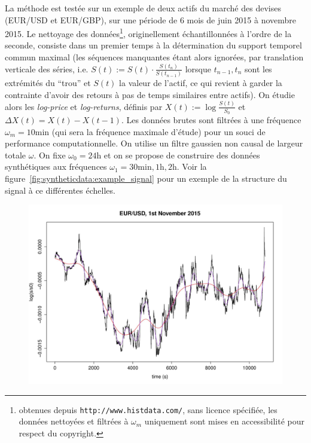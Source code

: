 {La méthode est testée sur un exemple de deux actifs du marché des devises (EUR/USD et EUR/GBP), sur une période de 6 mois de juin 2015 à novembre 2015. Le nettoyage des données\footnote{obtenues depuis \texttt{http://www.histdata.com/}, sans licence spécifiée, les données nettoyées et filtrées à $\omega_m$ uniquement sont mises en accessibilité pour respect du copyright.}, originellement échantillonnées à l'ordre de la seconde, consiste dans un premier temps à la détermination du support temporel commun maximal (les séquences manquantes étant alors ignorées, par translation verticale des séries, i.e. $S(t):=S(t)\cdot \frac{S(t_{n})}{S(t_{n-1})}$ lorsque $t_{n-1},t_n$ sont les extrémités du ``trou'' et $S(t)$ la valeur de l'actif, ce qui revient à garder la contrainte d'avoir des retours à pas de temps similaires entre actifs). On étudie alors les \emph{log-price} et \emph{log-returns}, définis par $X(t):=\log{\frac{S(t)}{S_0}}$ et $\Delta X (t) = X(t) - X(t-1)$. Les données brutes sont filtrées à une fréquence $\omega_m = 10\textrm{min}$ (qui sera la fréquence maximale d'étude) pour un souci de performance computationnelle. On utilise un filtre gaussien non causal de largeur totale $\omega$. On fixe $\omega_0=24\textrm{h}$ et on se propose de construire des données synthétiques aux fréquences $\omega_1 = 30\textrm{min},1\textrm{h},2\textrm{h}$. Voir la figure~\ref{fig:syntheticdata:example_signal} pour un exemple de la structure du signal à ce différentes échelles.
}


\begin{figure}%
\includegraphics[width=\linewidth]{Figures/Final/C-syntheticdata-example_signal.jpg}
\end{figure}

